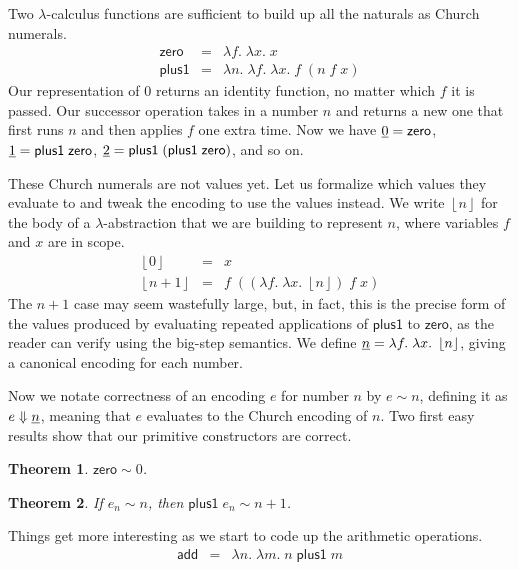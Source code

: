 \documentclass{amsbook}
\newtheorem{theorem}{Theorem}[chapter]
\theoremstyle{definition}
\theoremstyle{remark}
\numberwithin{section}{chapter}
\numberwithin{equation}{chapter}
\begin{document}
\newcommand{\lc}[1]{\mathsf{#1}}

Two $\lambda$-calculus functions are sufficient to build up all the naturals as Church numerals.
\begin{eqnarray*}
  \lc{zero} &=& \lambda f. \; \lambda x. \; x \\
  \lc{plus1} &=& \lambda n. \; \lambda f. \; \lambda x. \; f \; (n \; f \; x)
\end{eqnarray*}
Our representation of 0 returns an identity function, no matter which $f$ it is passed.
Our successor operation takes in a number $n$ and returns a new one that first runs $n$ and then applies $f$ one extra time.
Now we have $\church{0} = \lc{zero}$, $\church{1} = \lc{plus1} \; \lc{zero}$, $\church{2} = \lc{plus1} \; (\lc{plus1} \; \lc{zero})$, and so on.

\newcommand{\prechurch}[1]{\left \lfloor #1 \right \rfloor}

These Church numerals are not values yet.
Let us formalize which values they evaluate to and tweak the encoding to use the values instead.
We write $\prechurch{n}$ for the body of a $\lambda$-abstraction that we are building to represent $n$, where variables $f$ and $x$ are in scope.
\begin{eqnarray*}
  \prechurch{0} &=& x \\
  \prechurch{n+1} &=& f \; ((\lambda f. \; \lambda x. \; \prechurch{n}) \; f \; x)
\end{eqnarray*}
The $n+1$ case may seem wastefully large, but, in fact, this is the precise form of the values produced by evaluating repeated applications of $\lc{plus1}$ to $\lc{zero}$, as the reader can verify using the big-step semantics.
We define $\church{n} = \lambda f. \; \lambda x. \; \prechurch{n}$, giving a canonical encoding for each number.

Now we notate correctness of an encoding $e$ for number $n$ by $e \sim n$, defining it as $e \Downarrow \underline{n}$, meaning that $e$ evaluates to the Church encoding of $n$.
Two first easy results show that our primitive constructors are correct.

\begin{theorem}
  $\lc{zero} \sim 0$.
\end{theorem}

\begin{theorem}
  If $e_n \sim n$, then $\lc{plus1} \; e_n \sim n+1$.
\end{theorem}

Things get more interesting as we start to code up the arithmetic operations.
\begin{eqnarray*}
  \lc{add} &=& \lambda n. \; \lambda m. \; n \; \lc{plus1} \; m
\end{eqnarray*}
\end{document}
